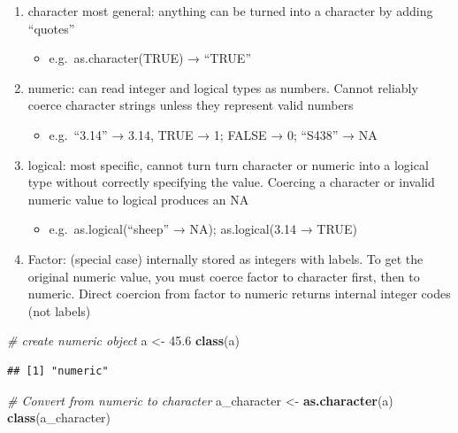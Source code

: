 \documentclass[
]{book}
\newenvironment{Shaded}{\begin{snugshade}}{\end{snugshade}}
\newcommand{\CommentTok}[1]{\textcolor[rgb]{0.56,0.35,0.01}{\textit{#1}}}
\newcommand{\FloatTok}[1]{\textcolor[rgb]{0.00,0.00,0.81}{#1}}
\newcommand{\FunctionTok}[1]{\textcolor[rgb]{0.13,0.29,0.53}{\textbf{#1}}}
\newcommand{\NormalTok}[1]{#1}
\newcommand{\OtherTok}[1]{\textcolor[rgb]{0.56,0.35,0.01}{#1}}
\providecommand{\tightlist}{%
  \setlength{\itemsep}{0pt}\setlength{\parskip}{0pt}}
\begin{document}
\begin{enumerate}
\def\labelenumi{\arabic{enumi}.}
\tightlist
\item
  character most general: anything can be turned into a character by adding ``quotes''

  \begin{itemize}
  \tightlist
  \item
    e.g.~as.character(TRUE) → ``TRUE''
  \end{itemize}
\item
  numeric: can read integer and logical types as numbers. Cannot reliably coerce character strings unless they represent valid numbers

  \begin{itemize}
  \tightlist
  \item
    e.g.~``3.14'' → 3.14, TRUE → 1; FALSE → 0; ``S438'' → NA
  \end{itemize}
\item
  logical: most specific, cannot turn turn character or numeric into a logical type without correctly specifying the value. Coercing a character or invalid numeric value to logical produces an NA

  \begin{itemize}
  \tightlist
  \item
    e.g.~as.logical(``sheep'' → NA); as.logical(3.14 → TRUE)
  \end{itemize}
\item
  Factor: (special case) internally stored as integers with labels. To get the original numeric value, you must coerce factor to character first, then to numeric. Direct coercion from factor to numeric returns internal integer codes (not labels)
\end{enumerate}

\begin{Shaded}
\begin{Highlighting}[]
\CommentTok{\# create numeric object}
\NormalTok{a }\OtherTok{\textless{}{-}} \FloatTok{45.6}
\FunctionTok{class}\NormalTok{(a)}
\end{Highlighting}
\end{Shaded}

\begin{verbatim}
## [1] "numeric"
\end{verbatim}

\begin{Shaded}
\begin{Highlighting}[]
\CommentTok{\# Convert from numeric to character}
\NormalTok{a\_character }\OtherTok{\textless{}{-}} \FunctionTok{as.character}\NormalTok{(a)}
\FunctionTok{class}\NormalTok{(a\_character)}
\end{Highlighting}
\end{Shaded}
\end{document}
